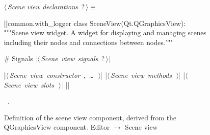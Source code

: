 \documentclass[%
    a4paper,    %
    justified,  %
    nobib,      %
    openany     %
]{tufte-book}
\begin{document}
\begin{figure}
\begin{flushleft} \small
\begin{minipage}{\linewidth}\label{scrap81}\raggedright\small
{} $\langle\,${\itshape Scene view declarations}\nobreak\ {\footnotesize {?}}$\,\rangle\equiv$
\vspace{-1ex}
\begin{pythoncode}
|\normalfont{}\fontfamily{}|common.with_logger
class SceneView(Qt.QGraphicsView):
    """Scene view widget.
    A widget for displaying and managing scenes including their nodes and
    connections between nodes."""

    # Signals
    |\hbox{$\langle\,${\itshape Scene view signals}\nobreak\ {\footnotesize ?}$\,\rangle$}|

    |\hbox{$\langle\,${\itshape Scene view constructor}\nobreak\ {\footnotesize {}, \ldots\ }$\,\rangle$}|
    |\hbox{$\langle\,${\itshape Scene view methods}\nobreak\ {\footnotesize {}}$\,\rangle$}|
    |\hbox{$\langle\,${\itshape Scene view slots}\nobreak\ {\footnotesize {}}$\,\rangle$}|
|\NWsep|
\end{pythoncode}
\vspace{1.5ex}
\footnotesize
\begin{list}{}{\setlength{\itemsep}{-\parsep}\setlength{\itemindent}{-\leftmargin}}
\item \NWtxtMacroRefIn\ .

\item{}
\end{list}
\end{minipage}\vspace{4ex}
\end{flushleft}
\caption{Definition of the scene view component, derived from the QGraphicsView
  component.
  \newline{}\newline{}Editor $\rightarrow$ Scene view}
\label{editor:lst:scene-view}
\end{figure}
\end{document}
